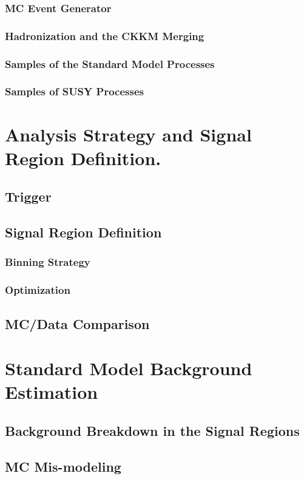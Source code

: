 		\subsubsection{MC Event Generator}
		\subsubsection{Hadronization and the CKKM Merging}
		\subsubsection{Samples of the Standard Model Processes}
		\subsubsection{Samples of SUSY Processes}
%
\section{Analysis Strategy and Signal Region Definition.} 
	\subsection{Trigger}
	\subsection{Signal Region Definition}
		\subsubsection{Binning Strategy}
		\subsubsection{Optimization}
	\subsection{MC/Data Comparison}
%
\section{Standard Model Background Estimation} 
	\subsection{Background Breakdown in the Signal Regions}
	\subsection{MC Mis-modeling}
